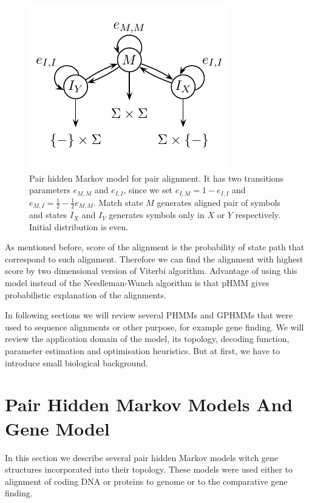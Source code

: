 \begin{figure}
\begin{center}
\includegraphics{../figures/pairHMM.pdf}
\end{center}
\caption[Simple pair HMM model for alignment]{Pair hidden Markov model for pair alignment. It has two transitions
parameters $e_{M,M}$ and $e_{I,I}$, since we set $e_{I,M} = 1 - e_{I,I}$ and
$e_{M,I}=\frac12-\frac12e_{M,M}$. Match state $M$ generates aligned pair of symbols
and states $I_X$ and $I_Y$ generates symbols only in $X$ or $Y$ respectively.
Initial distribution is even.
}\label{PHMM:FIG:SIMPLEPHMM}
\end{figure}

As mentioned before, score of the alignment is the probability of state path
that correspond to such alignment. Therefore we can find the alignment with
highest score by two dimensional version of Viterbi algorithm. Advantage of
using this model instead of the Needleman-Wunch algorithm is that pHMM gives
probabilistic explanation of the alignments. 

In following sections we will review several PHMMs and GPHMMs that were used to
sequence alignments or other purpose, for example gene finding. We will review
the application domain of the model, its topology, decoding function, parameter
estimation and optimisation heuristics. But at first, we have to introduce small
biological background.

\section{Pair Hidden Markov Models And Gene Model}

In this section we describe several pair hidden Markov models witch gene
structures incorporated into their topology. These models were used either to
alignment of coding DNA or proteins to genome or to the comparative gene
finding.

